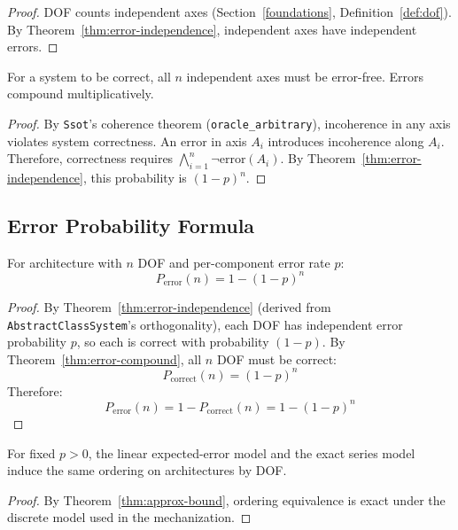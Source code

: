 \begin{proof}
DOF counts independent axes (Section~\ref{foundations}, Definition~\ref{def:dof}). By Theorem~\ref{thm:error-independence}, independent axes have independent errors.
\end{proof}

\begin{theorem}\label{thm:error-compound}
For a system to be correct, all $n$ independent axes must be error-free. Errors compound multiplicatively.
\end{theorem}

\begin{proof}
By \texttt{Ssot}'s coherence theorem (\texttt{oracle\_arbitrary}), incoherence in any axis violates system correctness. An error in axis $A_i$ introduces incoherence along $A_i$. Therefore, correctness requires $\bigwedge_{i=1}^{n} \neg\text{error}(A_i)$. By Theorem~\ref{thm:error-independence}, this probability is $(1-p)^n$.
\end{proof}

\subsection{Error Probability Formula}

\begin{theorem}\label{thm:error-prob}
For architecture with $n$ DOF and per-component error rate $p$:
\[
P_{\text{error}}(n) = 1 - (1-p)^n
\]
\end{theorem}

\begin{proof}
By Theorem~\ref{thm:error-independence} (derived from \texttt{AbstractClassSystem}'s orthogonality), each DOF has independent error probability $p$, so each is correct with probability $(1-p)$. By Theorem~\ref{thm:error-compound}, all $n$ DOF must be correct:
\[
P_{\text{correct}}(n) = (1-p)^n
\]
Therefore:
\[
P_{\text{error}}(n) = 1 - P_{\text{correct}}(n) = 1 - (1-p)^n
\]
\end{proof}

\begin{corollary}\label{cor:linear-approx}
For fixed $p>0$, the linear expected-error model and the exact series model induce the same ordering on architectures by DOF.
\end{corollary}

\begin{proof}
By Theorem~\ref{thm:approx-bound}, ordering equivalence is exact under the discrete model used in the mechanization.
\end{proof}

